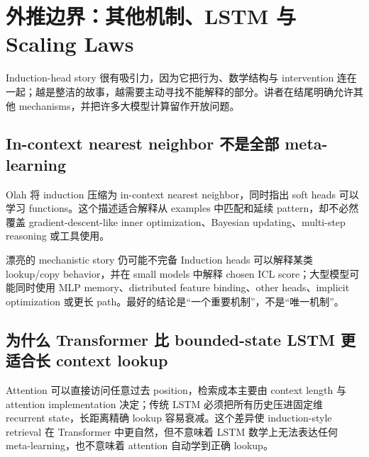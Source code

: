\section{外推边界：其他机制、LSTM 与 Scaling Laws}

Induction-head story 很有吸引力，因为它把行为、数学结构与 intervention 连在一起；越是整洁的故事，越需要主动寻找不能解释的部分。讲者在结尾明确允许其他 mechanisms，并把许多大模型计算留作开放问题。

\subsection{In-context nearest neighbor 不是全部 meta-learning}

Olah 将 induction 压缩为 in-context nearest neighbor，同时指出 soft heads 可以学习 functions。这个描述适合解释从 examples 中匹配和延续 pattern，却不必然覆盖 gradient-descent-like inner optimization、Bayesian updating、multi-step reasoning 或工具使用。



\begin{warningbox}{漂亮的 mechanistic story 仍可能不完备}
Induction heads 可以解释某类 lookup/copy behavior，并在 small models 中解释 chosen ICL score；大型模型可能同时使用 MLP memory、distributed feature binding、other heads、implicit optimization 或更长 path。最好的结论是“一个重要机制”，不是“唯一机制”。
\end{warningbox}


\subsection{为什么 Transformer 比 bounded-state LSTM 更适合长 context lookup}

Attention 可以直接访问任意过去 position，检索成本主要由 context length 与 attention implementation 决定；传统 LSTM 必须把所有历史压进固定维 recurrent state，长距离精确 lookup 容易衰减。这个差异使 induction-style retrieval 在 Transformer 中更自然，但不意味着 LSTM 数学上无法表达任何 meta-learning，也不意味着 attention 自动学到正确 lookup。

